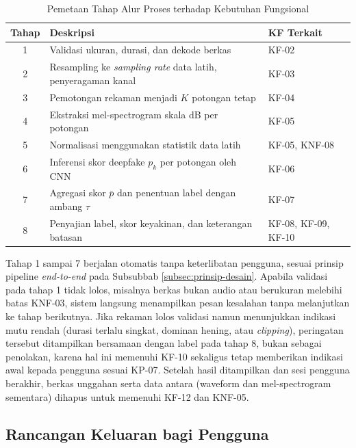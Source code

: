 \begin{table}[htbp]
  \centering
  \caption{Pemetaan Tahap Alur Proses terhadap Kebutuhan Fungsional}
  \label{tab:pemetaan-alur-kf}
  \begin{tabular}{@{}cll@{}}
    \toprule
    \textbf{Tahap} & \textbf{Deskripsi} & \textbf{KF Terkait} \\
    \midrule
    1 & Validasi ukuran, durasi, dan dekode berkas & KF-02 \\
    2 & Resampling ke \textit{sampling rate} data latih, penyeragaman kanal & KF-03 \\
    3 & Pemotongan rekaman menjadi $K$ potongan tetap & KF-04 \\
    4 & Ekstraksi mel-spectrogram skala dB per potongan & KF-05 \\
    5 & Normalisasi menggunakan statistik data latih & KF-05, KNF-08 \\
    6 & Inferensi skor deepfake $p_k$ per potongan oleh CNN & KF-06 \\
    7 & Agregasi skor $\bar{p}$ dan penentuan label dengan ambang $\tau$ & KF-07 \\
    8 & Penyajian label, skor keyakinan, dan keterangan batasan & KF-08, KF-09, KF-10 \\
    \bottomrule
  \end{tabular}
\end{table}

Tahap 1 sampai 7 berjalan otomatis tanpa keterlibatan pengguna, sesuai prinsip
pipeline \textit{end-to-end} pada Subsubbab \ref{subsec:prinsip-desain}. Apabila
validasi pada tahap 1 tidak lolos, misalnya berkas bukan audio atau berukuran
melebihi batas KNF-03, sistem langsung menampilkan pesan kesalahan tanpa
melanjutkan ke tahap berikutnya. Jika rekaman lolos validasi namun menunjukkan
indikasi mutu rendah (durasi terlalu singkat, dominan hening, atau \textit{clipping}),
peringatan tersebut ditampilkan bersamaan dengan label pada tahap 8, bukan sebagai
penolakan, karena hal ini memenuhi KF-10 sekaligus tetap memberikan indikasi awal
kepada pengguna sesuai KP-07. Setelah hasil ditampilkan dan sesi pengguna berakhir,
berkas unggahan serta data antara (waveform dan mel-spectrogram sementara) dihapus
untuk memenuhi KF-12 dan KNF-05.

\subsection{Rancangan Keluaran bagi Pengguna}
\label{subsec:rancangan-keluaran}

